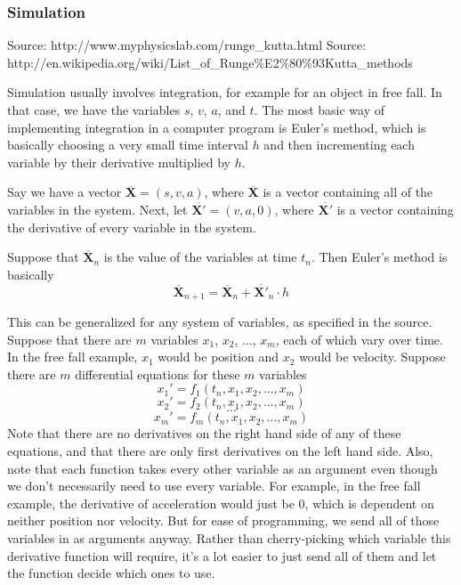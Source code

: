 \documentclass[12pt]{article}
\newcommand{\bfvec}[1]{\overline{\mathbf{#1}}}
\begin{document}
	\subsubsection*{Simulation}
	
	Source: http://www.myphysicslab.com/runge\_kutta.html
	Source: http://en.wikipedia.org/wiki/List\_of\_Runge\%E2\%80\%93Kutta\_methods
	
	Simulation usually involves integration, for example for an object in free fall. In that case, we have the variables $s$, $v$, $a$, and $t$. The most basic way of implementing integration in a computer program is Euler's method, which is basically choosing a very small time interval $h$ and then incrementing each variable by their derivative multiplied by $h$.

	Say we have a vector $\bfvec{X} = (s, v, a)$, where $\bfvec{X}$ is a vector containing all of the variables in the system. Next, let $\bfvec{X'} = (v, a, 0)$, where $\bfvec{X'}$ is a vector containing the derivative of every variable in the system.

	Suppose that $\bfvec{X}_n$ is the value of the variables at time $t_n$. Then Euler's method is basically
			$$\bfvec{X}_{n+1} = \bfvec{X}_n + \bfvec{X'}_n \cdot h$$
			
	This can be generalized for any system of variables, as specified in the source. Suppose that there are $m$ variables $x_1$, $x_2$, ..., $x_m$, each of which vary over time. In the free fall example, $x_1$ would be position and $x_2$ would be velocity. Suppose there are $m$ differential equations for these $m$ variables
			$$x_1' = f_1(t_n, x_1,x_2,...,x_m)$$
			$$x_2' = f_2(t_n, x_1,x_2,...,x_m)$$
			$$...$$
			$$x_m' = f_m(t_n, x_1,x_2,...,x_m)$$
	Note that there are no derivatives on the right hand side of any of these equations, and that there are only first derivatives on the left hand side. Also, note that each function takes every other variable as an argument even though we don't necessarily need to use every variable. For example, in the free fall example, the derivative of acceleration would just be 0, which is dependent on neither position nor velocity. But for ease of programming, we send all of those variables in as arguments anyway. Rather than cherry-picking which variable this derivative function will require, it's a lot easier to just send all of them and let the function decide which ones to use. 
	
\end{document}
